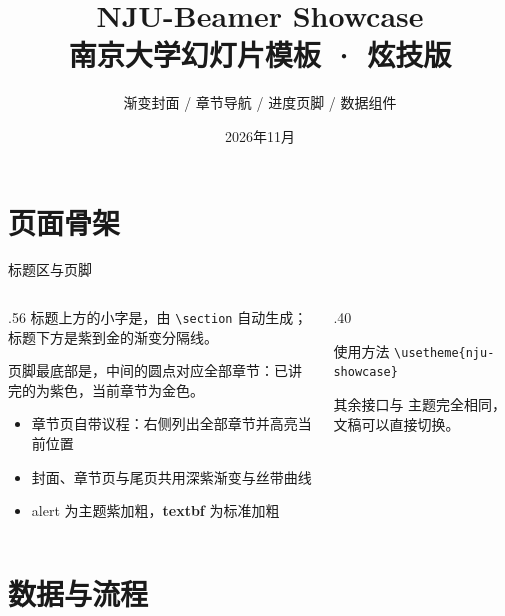 \documentclass[aspectratio=169,10pt]{beamer}
\title[NJU-Beamer Showcase]{NJU-Beamer Showcase\\南京大学幻灯片模板 · 炫技版}
\subtitle{渐变封面 / 章节导航 / 进度页脚 / 数据组件}
\date{2026年11月}
\begin{document}
\NJUtitleframe

\section{页面骨架}

\begin{frame}[t]{标题区与页脚}
\begin{columns}[T,onlytextwidth]
  \begin{column}{.56\textwidth}
    标题上方的小字是，由 \texttt{\textbackslash section} 自动生成；标题下方是紫到金的渐变分隔线。

    页脚最底部是，中间的圆点对应全部章节：已讲完的为紫色，当前章节为金色。

    \begin{itemize}
      \item 章节页自带议程：右侧列出全部章节并高亮当前位置
      \item 封面、章节页与尾页共用深紫渐变与丝带曲线
      \item \alert{alert} 为主题紫加粗，\textbf{textbf} 为标准加粗
    \end{itemize}
  \end{column}
  \begin{column}{.40\textwidth}
    \begin{njuquote}{使用方法}
      \texttt{\textbackslash usetheme\{nju-showcase\}}

      其余接口与  主题完全相同，文稿可以直接切换。
    \end{njuquote}
       
  \end{column}
\end{columns}
\end{frame}

\section{数据与流程}
\end{document}
